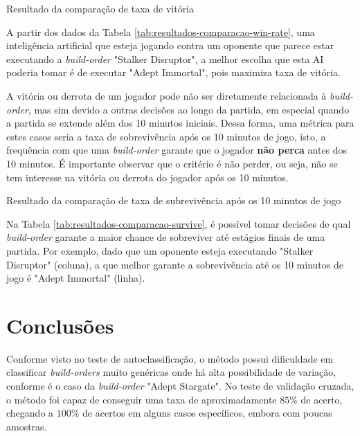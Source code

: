 \begin{table}[H]
\centering
\caption{Resultado da comparação de taxa de vitória}
\label{tab:resultados-comparacao-win-rate}
\begin{adjustbox}{width=1\textwidth}

\end{adjustbox}
\end{table}

A partir dos dados da Tabela \ref{tab:resultados-comparacao-win-rate}, uma inteligência artificial que esteja jogando contra um oponente que parece estar executando a \textit{\gls{build-order}} "Stalker Disruptor", a melhor escolha que esta AI poderia tomar é de executar "Adept Immortal", pois maximiza taxa de vitória.

A vitória ou derrota de um jogador pode não ser diretamente relacionada à \textit{\gls{build-order}}, mas sim devido a outras decisões ao longo da partida, em especial quando a partida se extende além dos 10 minutos iniciais. Dessa forma, uma métrica para estes casos seria a taxa de sobrevivência após os 10 minutos de jogo, isto, a frequência com que uma \textit{\gls{build-order}} garante que o jogador \textbf{não perca} antes dos 10 minutos. É importante observar que o critério é não perder, ou seja, não se tem interesse na vitória ou derrota do jogador após os 10 minutos.

\begin{table}[H]
\centering
\caption{Resultado da comparação de taxa de subrevivência após os 10 minutos de jogo}
\label{tab:resultados-comparacao-survive}
\begin{adjustbox}{width=1\textwidth}

\end{adjustbox}
\end{table}

Na Tabela \ref{tab:resultados-comparacao-survive}, é possível tomar decisões de qual \textit{\gls{build-order}} garante a maior chance de sobreviver até estágios finais de uma partida. Por exemplo, dado que um oponente esteja executando "Stalker Disruptor" (coluna), a que melhor garante a sobrevivência até os 10 minutos de jogo é "Adept Immortal" (linha).

	\chapter{Conclusões}
Conforme visto no teste de autoclassificação, o método possui dificuldade em classificar \textit{\glspl{build-order}} muito genéricas onde há alta possibilidade de variação, conforme é o caso da \textit{\gls{build-order}} "Adept Stargate". No teste de validação cruzada, o método foi capaz de conseguir uma taxa de aproximadamente $85\%$ de acerto, chegando a $100\%$ de acertos em alguns casos específicos, embora com poucas amostras.

